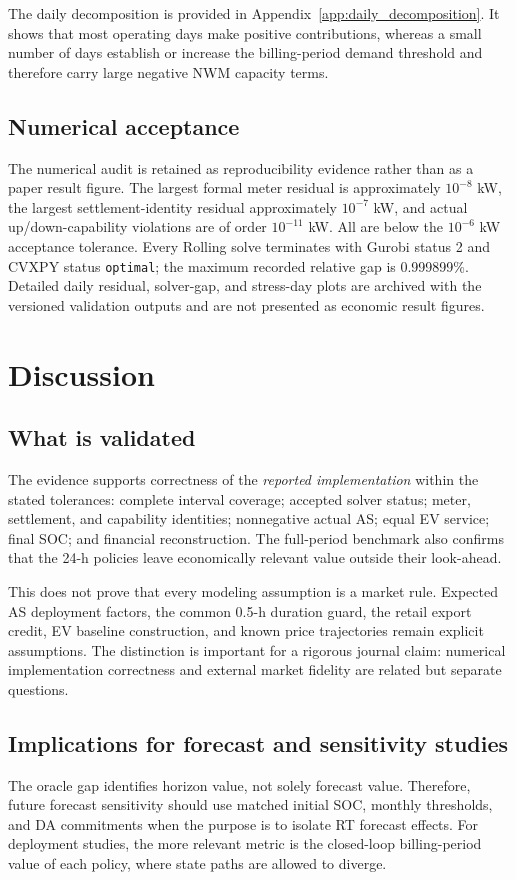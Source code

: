 \documentclass[final,5p,times]{elsarticle}
\begin{document}
The daily decomposition is provided in Appendix~\ref{app:daily_decomposition}.
It shows that most operating days make positive contributions, whereas a small
number of days establish or increase the billing-period demand threshold and
therefore carry large negative NWM capacity terms.

\subsection{Numerical acceptance}
The numerical audit is retained as reproducibility evidence rather than as a
paper result figure. The largest formal meter residual is approximately
$10^{-8}$ kW, the largest settlement-identity residual approximately
$10^{-7}$ kW, and actual up/down-capability violations are of order
$10^{-11}$ kW. All are below the $10^{-6}$ kW acceptance tolerance. Every
Rolling solve terminates with Gurobi status 2 and CVXPY status
\texttt{optimal}; the maximum recorded relative gap is 0.999899\%. Detailed
daily residual, solver-gap, and stress-day plots are archived with the
versioned validation outputs and are not presented as economic result figures.

\section{Discussion}
\label{sec:discussion}

\subsection{What is validated}
The evidence supports correctness of the \emph{reported implementation} within
the stated tolerances: complete interval coverage; accepted solver status;
meter, settlement, and capability identities; nonnegative actual AS; equal EV
service; final SOC; and financial reconstruction. The full-period benchmark
also confirms that the 24-h policies leave economically relevant value outside
their look-ahead.

This does not prove that every modeling assumption is a market rule. Expected
AS deployment factors, the common 0.5-h duration guard, the retail export
credit, EV baseline construction, and known price trajectories remain explicit
assumptions. The distinction is important for a rigorous journal claim:
numerical implementation correctness and external market fidelity are related
but separate questions.

\subsection{Implications for forecast and sensitivity studies}
The oracle gap identifies horizon value, not solely forecast value. Therefore,
future forecast sensitivity should use matched initial SOC, monthly thresholds,
and DA commitments when the purpose is to isolate RT forecast effects. For
deployment studies, the more relevant metric is the closed-loop billing-period
value of each policy, where state paths are allowed to diverge.
\end{document}
